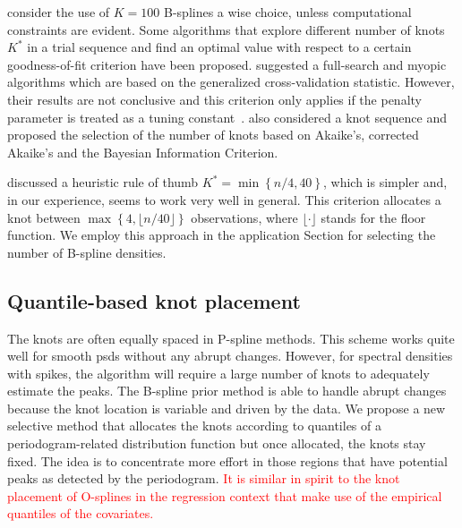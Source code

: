 \documentclass[twocolumn,final]{svjour3}
\begin{document}
\cite{Eilers2015} consider the use of $K=100$ B-splines a wise choice, unless computational constraints are evident.  Some algorithms that explore different number of knots $K^*$ in a trial sequence and find an optimal value with respect to a certain goodness-of-fit criterion have been proposed. \cite{Ruppert2002} suggested a full-search and myopic algorithms which are based on the generalized cross-validation statistic.  However, their results are not conclusive and this criterion only applies if the penalty parameter is treated as a tuning constant~\citep{Kauermann2011}.  \cite{Likhachev2017} also considered a knot sequence and proposed the selection of the number of knots based on  Akaike's, corrected Akaike's and
the Bayesian Information Criterion.

\cite{Ruppert2002} discussed a heuristic rule of thumb $K^* = \min\left\{n/4, 40\right\}$, which is simpler and, in our experience, seems to work very well in general.  This criterion allocates a knot between $\max\left\{ 4, \lfloor n/40 \rfloor \right\}$ observations, where $\lfloor \cdot \rfloor$ stands for the floor function.  We employ this approach in the application Section for selecting the number of B-spline densities.


\subsection*{Quantile-based knot placement}

The knots are often equally spaced in P-spline methods.  This scheme works quite well  for smooth psds without any abrupt changes.  However, for spectral densities with spikes, the algorithm will require a large number of knots to adequately estimate the peaks.  The B-spline prior method is able to handle abrupt changes because the knot location is variable and  driven by the data.  We propose a new selective method that allocates the knots according to quantiles of a periodogram-related distribution function but once allocated, the knots stay fixed.  The idea is to concentrate more effort in those regions that have potential peaks as detected by the periodogram.  \textcolor{red}{It is similar in spirit to the knot placement of O-splines \cite{WandOrmerod} in the regression context that make use of the empirical quantiles of the covariates. }
\end{document}
